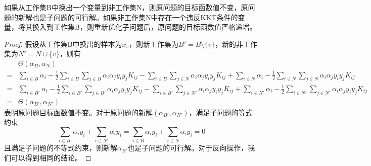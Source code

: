 \begin{theorem}[Osuna定理]
如果从工作集B中换出一个变量到非工作集N，则原问题的目标函数值不变，原问题的新解也是子问题的可行解。如果非工作集N中存在一个违反KKT条件的变量，将其换入到工作集B，则重新优化子问题后，原问题的目标函数值严格递增。
\end{theorem}
\begin{proof}
假设从工作集B中换出的样本为$x_v$，则新工作集为$B'=B\setminus \{v\}$，新的非工作集为$N'=N\cup\{v\}$，则有
\begin{equation}
    \begin{array}{ll}
       & \Theta(\alpha_B,\alpha_N) \\
      = & \sum\limits_{i\in B} \alpha_i - \frac{1}{2} \sum\limits_{i\in B} \sum\limits_{j\in B} \alpha_i\alpha_j y_i y_j K_{ij} - \sum\limits_{i\in B}\sum\limits_{j\in N} \alpha_i\alpha_j y_i y_j K_{ij} + \sum\limits_{i\in N} \alpha_i - \frac{1}{2} \sum\limits_{i\in N} \sum\limits_{j\in N} \alpha_i\alpha_j y_i y_j K_{ij}\\
      = & \sum\limits_{i\in B'} \alpha_i - \frac{1}{2} \sum\limits_{i\in B'} \sum\limits_{j\in B'} \alpha_i\alpha_j y_i y_j K_{ij} - \sum\limits_{i\in B'}\sum\limits_{j\in N'} \alpha_i\alpha_j y_i y_j K_{ij} + \sum\limits_{i\in N'} \alpha_i - \frac{1}{2} \sum\limits_{i\in N'} \sum\limits_{j\in N'} \alpha_i\alpha_j y_i y_j K_{ij} \\
      = & \Theta(\alpha_{B'},\alpha_{N'})
    \end{array}
\end{equation}
表明原问题目标函数值不变。对于原问题的新解$(\alpha_{B'},\alpha_{N'})$，满足子问题的等式约束
\begin{equation}
    \sum\limits_{i\in B'} \alpha_i y_i + \sum\limits_{i\in N'} \alpha_i y_i = \sum\limits_{i\in B} \alpha_i y_i + \sum\limits_{i\in N} \alpha_i y_i = 0
\end{equation}
且满足子问题的不等式约束，则新解$\alpha_{B'}$也是子问题的可行解。对于反向操作，我们可以得到相同的结论。


\end{proof}
